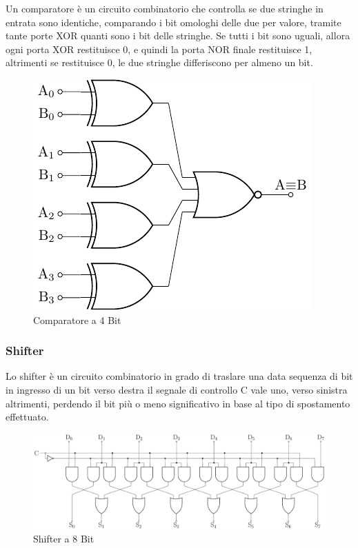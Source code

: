 \documentclass{article}
\numberwithin{equation}{subsection}
\begin{document}
Un comparatore è un circuito combinatorio che controlla se due stringhe in entrata sono identiche, comparando i bit omologhi delle due per valore, tramite tante porte XOR quanti sono i bit delle stringhe. Se tutti 
i bit sono uguali, allora ogni porta XOR restituisce 0, e quindi la porta NOR finale restituisce 1, altrimenti se restituisce 0, le due stringhe differiscono per almeno un bit. 

\begin{figure}[H]%
    \centering%
    \includegraphics{comparatore-4-bit.pdf}%
    \caption{Comparatore a 4 Bit}%
\end{figure}

\subsubsection{Shifter}

Lo shifter è un circuito combinatorio in grado di traslare una data sequenza di bit in ingresso di un bit verso destra il segnale di controllo C vale uno, verso sinistra altrimenti, perdendo il bit più o meno 
significativo in base al tipo di spostamento effettuato. 
\begin{figure}[H]%
    \centering%
    \includegraphics[scale=0.55]{shifter-8-bit.pdf}%
    \caption{Shifter a 8 Bit}%
\end{figure}
\end{document}
